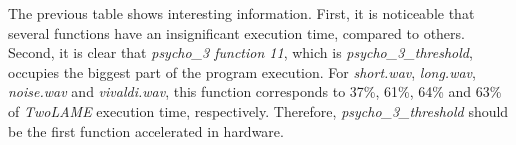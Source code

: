 \vspace{1cm}

The previous table shows interesting information. First, it is noticeable that several functions have an insignificant execution time, compared to others. Second, it is clear that \textit{psycho\_3 function 11}, which is \textit{psycho\_3\_threshold}, occupies the biggest part of the program execution. For \textit{short.wav}, \textit{long.wav}, \textit{noise.wav} and \textit{vivaldi.wav}, this function corresponds to 37\%, 61\%, 64\% and 63\% of \textit{TwoLAME} execution time, respectively.
Therefore, \textit{psycho\_3\_threshold} should be the first function accelerated in hardware.

